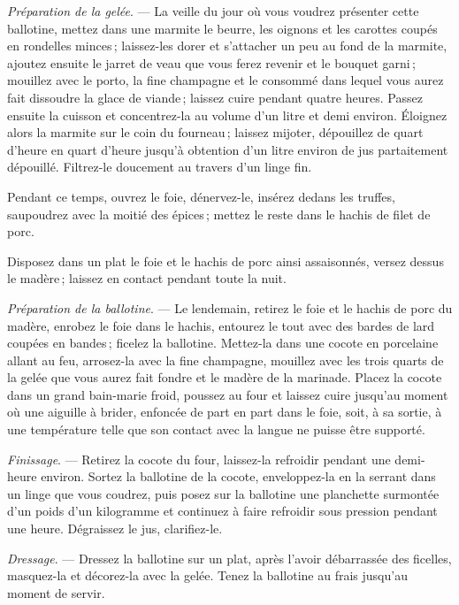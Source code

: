 \textit{Préparation de la gelée}. — La veille du jour où vous voudrez présenter
cette ballotine, mettez dans une marmite le beurre, les oignons et les carottes
coupés en rondelles minces ; laissez-les dorer et s'attacher un peu au fond de
la marmite, ajoutez ensuite le jarret de veau que vous ferez revenir et le
bouquet garni ; mouillez avec le porto, la fine champagne et le consommé dans
lequel vous aurez fait dissoudre la glace de viande ; laissez cuire pendant
quatre heures. Passez ensuite la cuisson et concentrez-la au volume d'un litre
et demi environ. Éloignez alors la marmite sur le coin du fourneau ; laissez
mijoter, dépouillez de quart d'heure en quart d'heure jusqu'à obtention d'un
litre environ de jus partaitement dépouillé. Filtrez-le doucement au travers
d’un linge fin.

Pendant ce temps, ouvrez le foie, dénervez-le, insérez dedans les truffes,
saupoudrez avec la moitié des épices ; mettez le reste dans le hachis de filet
de porc.

Disposez dans un plat le foie et le hachis de porc ainsi assaisonnés, versez
dessus le madère ; laissez en contact pendant toute la nuit.

\medskip

\textit{Préparation de la ballotine}. — Le lendemain, retirez le foie et le
hachis de porc du madère, enrobez le foie dans le hachis, entourez le tout avec
des bardes de lard coupées en bandes ; ficelez la ballotine. Mettez-la dans une
cocote en porcelaine allant au feu, arrosez-la avec la fine champagne, mouillez
avec les trois quarts de la gelée que vous aurez fait fondre et le madère de la
marinade. Placez la cocote dans un grand bain-marie froid, poussez au four et
laissez cuire jusqu'au moment où une aiguille à brider, enfoncée de part en
part dans le foie, soit, à sa sortie, à une température telle que son contact
avec la langue ne puisse être supporté.

\medskip

\textit{Finissage}. — Retirez la cocote du four, laissez-la refroidir pendant
une demi-heure environ. Sortez la ballotine de la cocote, enveloppez-la en la
serrant dans un linge que vous coudrez, puis posez sur la ballotine une
planchette surmontée d'un poids d'un kilogramme et continuez à faire refroidir
sous pression pendant une heure. Dégraissez le jus, clarifiez-le.

\medskip

\textit{Dressage}. — Dressez la ballotine sur un plat, après l'avoir
débarrassée des ficelles, masquez-la et décorez-la avec la gelée. Tenez la
ballotine au frais jusqu'au moment de servir.

